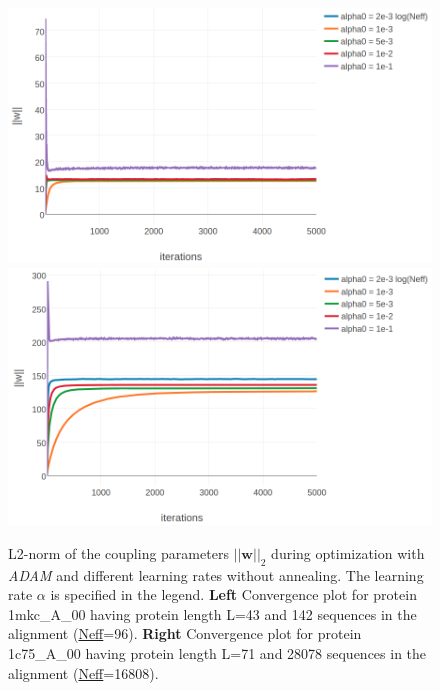 \documentclass[11pt,a4paper,twoside]{book}
\newcommand{\w}{\mathbf{w}}
\theoremstyle{definition}
\theoremstyle{definition}
\theoremstyle{remark}
\begin{document}
\begin{figure}

{\centering \includegraphics[width=0.5\linewidth]{img/full_likelihood/adam/1mkcA00_learningrates_parameternorm} \includegraphics[width=0.5\linewidth]{img/full_likelihood/adam/1c75A00_learningrates_parameternorm} 

}

\caption{L2-norm of the coupling parameters
\(||\w||_2\) during optimization with \emph{ADAM} and different learning
rates without annealing. The learning rate \(\alpha\) is specified in
the legend. \textbf{Left} Convergence plot for protein 1mkc\_A\_00
having protein length L=43 and 142 sequences in the alignment
(\protect\hyperlink{abbrev}{Neff}=96). \textbf{Right} Convergence plot
for protein 1c75\_A\_00 having protein length L=71 and 28078 sequences
in the alignment (\protect\hyperlink{abbrev}{Neff}=16808).}\label{fig:adam-learning-rate}
\end{figure}
\end{document}
